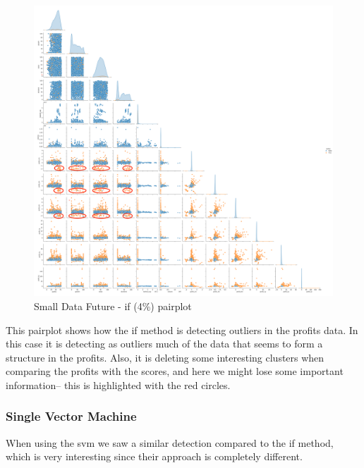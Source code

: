 \documentclass[11pt,english,a4paper,hidelinks]{book}
\begin{document}
\begin{figure}[H]
    \centering
    \includegraphics[width=1\textwidth]{images/code/outliers/Small Data future - IF.png}
    \caption{Small Data Future - \acrshort{if} (4\%) \acrshort{pairplot}}
    \label{fig:small_data_future_if}
\end{figure}

\noindent This \acrshort{pairplot} shows how the \acrshort{if} method is detecting outliers in the profits data. In this case it is detecting as outliers much of the data that seems to form a structure in the profits. Also, it is deleting some interesting clusters when comparing the profits with the scores, and here we might lose some important information-- this is highlighted with the red circles.

\newpage

\subsubsection{Single Vector Machine}

When using the \acrshort{svm} we saw a similar detection compared to the \acrshort{if} method, which is very interesting since their approach is completely different.
\end{document}
